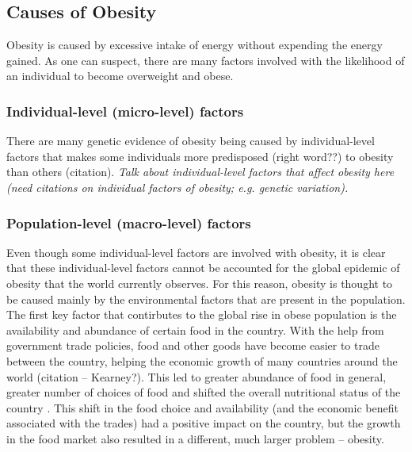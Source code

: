 \subsection{Causes of Obesity}
\label{sub:causes_of_obesity}

Obesity is caused by excessive intake of energy without expending the energy gained.
As one can suspect, there are many factors involved with the likelihood of an individual to become overweight and obese.

\subsubsection{Individual-level (micro-level) factors}
\label{ssub:Individual-level_(micro-level)_factors}

There are many genetic evidence of obesity being caused by individual-level factors that makes some individuals more predisposed (right word??) to obesity than others (citation).
\textit{Talk about individual-level factors that affect obesity here (need citations on individual factors of obesity; e.g. genetic variation).}

\subsubsection{Population-level (macro-level) factors}
\label{ssub:Population-level_(macro-level)_factors}

Even though some individual-level factors are involved with obesity, it is clear that these individual-level factors cannot be accounted for the global epidemic of obesity that the world currently observes.
For this reason, obesity is thought to be caused mainly by the environmental factors that are present in the population.\\

\noindent
The first key factor that contirbutes to the global rise in obese population is the availability and abundance of certain food in the country.
With the help from government trade policies, food and other goods have become easier to trade between the country, helping the economic growth of many countries around the world (citation -- Kearney?).
This led to greater abundance of food in general, greater number of choices of food and shifted the overall nutritional status of the country \citep{Malik2013}.
This shift in the food choice and availability (and the economic benefit associated with the trades) had a positive impact on the country, but the growth in the food market also resulted in a different, much larger problem -- obesity.

